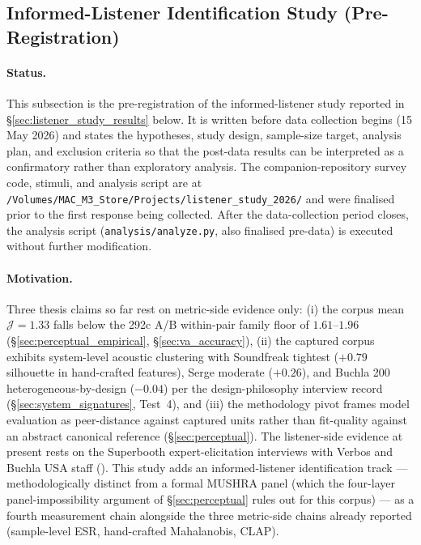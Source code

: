 \subsection{Informed-Listener Identification Study (Pre-Registration)}
\label{sec:listener_study_prereg}

\paragraph{Status.} This subsection is the pre-registration of the informed-listener study reported in \S\ref{sec:listener_study_results} below. It is written before data collection begins (15 May 2026) and states the hypotheses, study design, sample-size target, analysis plan, and exclusion criteria so that the post-data results can be interpreted as a confirmatory rather than exploratory analysis. The companion-repository survey code, stimuli, and analysis script are at \texttt{/Volumes/MAC\_M3\_Store/Projects/listener\_study\_2026/} and were finalised prior to the first response being collected. After the data-collection period closes, the analysis script (\texttt{analysis/analyze.py}, also finalised pre-data) is executed without further modification.

\paragraph{Motivation.} Three thesis claims so far rest on metric-side evidence only: (i) the corpus mean $\mathcal{J} = 1.33$ falls below the 292c A/B within-pair family floor of $1.61$--$1.96$ (\S\ref{sec:perceptual_empirical}, \S\ref{sec:va_accuracy}), (ii) the captured corpus exhibits system-level acoustic clustering with Soundfreak tightest ($+0.79$ silhouette in hand-crafted features), Serge moderate ($+0.26$), and Buchla 200 heterogeneous-by-design ($-0.04$) per the design-philosophy interview record (\S\ref{sec:system_signatures}, Test~4), and (iii) the methodology pivot frames model evaluation as peer-distance against captured units rather than fit-quality against an abstract canonical reference (\S\ref{sec:perceptual}). The listener-side evidence at present rests on the Superbooth expert-elicitation interviews with Verbos and Buchla USA staff (\cite{verbos2026superbooth,buchla2026superbooth}). This study adds an informed-listener identification track --- methodologically distinct from a formal MUSHRA panel (which the four-layer panel-impossibility argument of \S\ref{sec:perceptual} rules out for this corpus) --- as a fourth measurement chain alongside the three metric-side chains already reported (sample-level ESR, hand-crafted Mahalanobis, CLAP).

